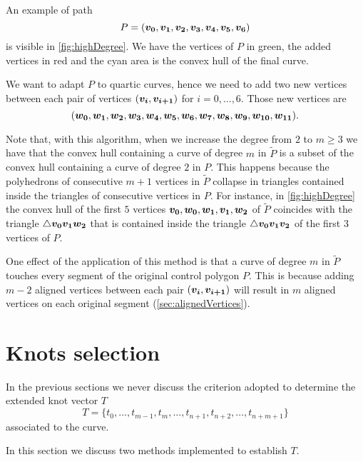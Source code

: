 \documentclass[dissertation.tex]{subfiles}
\begin{document}
An example of path
\begin{equation*}
  P=(\boldsymbol{v_0},\boldsymbol{v_1},\boldsymbol{v_2},\boldsymbol{v_3},\boldsymbol{v_4},\boldsymbol{v_5},\boldsymbol{v_6})
\end{equation*}
is visible in \cref{fig:highDegree}.
We have the vertices of $P$ in green, the added vertices in red and
the cyan area is the convex hull of the final curve.

We want to adapt $P$ to quartic \bs curves, hence we need to add two new
vertices between each pair of vertices $(\boldsymbol{v_i},\boldsymbol{v_{i+1}})$ for
$i=0,\dots,6$. Those new vertices are
\begin{equation*}
  (\boldsymbol{w_0},\boldsymbol{w_1},\boldsymbol{w_2},\boldsymbol{w_3},\boldsymbol{w_4},\boldsymbol{w_5},\boldsymbol{w_6},\boldsymbol{w_7},\boldsymbol{w_8},\boldsymbol{w_9},\boldsymbol{w_{10}},\boldsymbol{w_{11}}).
\end{equation*}

Note that, with this algorithm, when we increase the degree from $2$
to $m\ge 3$ we have that the convex hull containing a \bs curve of
degree $m$ in
$\tilde{P}$ is a subset of the convex hull containing a \bs curve
of degree $2$
in $P$. This happens because the polyhedrons of consecutive $m+1$ vertices in
$\tilde{P}$ collapse in triangles contained inside the triangles
of consecutive vertices in $P$. For instance, in \cref{fig:highDegree}
the convex hull of the first $5$ vertices
$\boldsymbol{v_0},\boldsymbol{w_0},\boldsymbol{w_1},\boldsymbol{v_1},\boldsymbol{w_2}$ of $\tilde{P}$
coincides with the
triangle $\triangle \boldsymbol{v_0}\boldsymbol{v_1}\boldsymbol{w_2}$ that is contained inside
the triangle $\triangle \boldsymbol{v_0}\boldsymbol{v_1}\boldsymbol{v_2}$ of the first $3$
vertices of $P$.

One effect of the application of this method is that a curve of
degree $m$ in $\tilde{P}$ touches
every segment of the original control polygon $P$. This is because adding
$m-2$ aligned vertices between each pair $(\boldsymbol{v_i},\boldsymbol{v_{i+1}})$
will result in $m$ aligned vertices on each original segment
(\cref{sec:alignedVertices}).

\section{Knots selection}\label{sec:knotSel}
In the previous sections we never discuss the criterion adopted to
determine the extended knot vector $T$
\begin{equation*}
  T=\{t_0,\dots,t_{m-1},t_{m},\dots,t_{n+1},t_{n+2},\dots,t_{n+m+1}\}
\end{equation*}
associated to the \bs curve.

In this section we discuss two
methods implemented to establish $T$.
\end{document}
